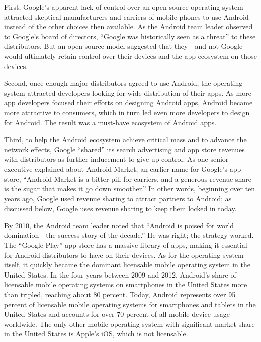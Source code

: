 \documentclass[11pt,b5paper]{scrartcl}
\begin{document}

First, Google’s apparent lack of control over an open-source operating system
attracted skeptical manufacturers and carriers of mobile phones to use Android instead of the
other choices then available. As the Android team leader observed to Google’s board of
directors, “Google was historically seen as a threat” to these distributors. But an open-source
model suggested that they—and not Google—would ultimately retain control over their devices
and the app ecosystem on those devices.


Second, once enough major distributors agreed to use Android, the operating
system attracted developers looking for wide distribution of their apps. As more app developers
focused their efforts on designing Android apps, Android became more attractive to consumers,
which in turn led even more developers to design for Android. The result was a must-have
ecosystem of Android apps.


Third, to help the Android ecosystem achieve critical mass and to advance the
network effects, Google “shared” its search advertising and app store revenues with distributors
as further inducement to give up control. As one senior executive explained about Android
Market, an earlier name for Google’s app store, “Android Market is a bitter pill for carriers, and
a generous revenue share is the sugar that makes it go down smoother.” In other words,
beginning over ten years ago, Google used revenue sharing to attract partners to Android; as
discussed below, Google uses revenue sharing to keep them locked in today.


By 2010, the Android team leader noted that “Android is poised for world
domination—the success story of the decade.” He was right; the strategy worked. The “Google
Play” app store has a massive library of apps, making it essential for Android distributors to have
on their devices. As for the operating system itself, it quickly became the dominant licensable
mobile operating system in the United States. In the four years between 2009 and 2012,
Android’s share of licensable mobile operating systems on smartphones in the United States
more than tripled, reaching about 80 percent. Today, Android represents over 95 percent of
licensable mobile operating systems for smartphones and tablets in the United States and
accounts for over 70 percent of all mobile device usage worldwide. The only other mobile
operating system with significant market share in the United States is Apple’s iOS, which is not
licensable.
\end{document}
